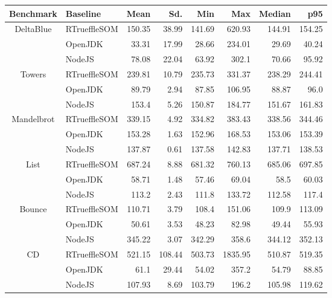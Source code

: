 \begin{center}
\begin{tabular}{ c | l r r r r r r}
\toprule
\textbf{Benchmark} & \textbf{Baseline} & \textbf{Mean} & \textbf{Sd.} & \textbf{Min} & \textbf{Max} & \textbf{Median} & \textbf{p95}\\
\toprule

\multirow{3}{*}{ DeltaBlue } & RTrueffleSOM & 150.35 & 38.99 & 141.69 & 620.93 & 144.91 & 154.25 \\
& OpenJDK & 33.31 & 17.99 & 28.66 & 234.01 & 29.69 & 40.24 \\
& NodeJS & 78.08 & 22.04 & 63.92 & 302.1 & 70.66 & 95.92 \\
\midrule

\multirow{3}{*}{ Towers } & RTrueffleSOM & 239.81 & 10.79 & 235.73 & 331.37 & 238.29 & 244.41 \\
& OpenJDK & 89.79 & 2.94 & 87.85 & 106.95 & 88.87 & 96.0 \\
& NodeJS & 153.4 & 5.26 & 150.87 & 184.77 & 151.67 & 161.83 \\
\midrule

\multirow{3}{*}{ Mandelbrot } & RTrueffleSOM & 339.15 & 4.92 & 334.82 & 383.43 & 338.56 & 344.46 \\
& OpenJDK & 153.28 & 1.63 & 152.96 & 168.53 & 153.06 & 153.39 \\
& NodeJS & 137.87 & 0.61 & 137.58 & 142.83 & 137.71 & 138.53 \\
\midrule

\multirow{3}{*}{ List } & RTrueffleSOM & 687.24 & 8.88 & 681.32 & 760.13 & 685.06 & 697.85 \\
& OpenJDK & 58.71 & 1.48 & 57.46 & 69.04 & 58.5 & 60.03 \\
& NodeJS & 113.2 & 2.43 & 111.8 & 133.72 & 112.58 & 117.4 \\
\midrule

\multirow{3}{*}{ Bounce } & RTrueffleSOM & 110.71 & 3.79 & 108.4 & 151.06 & 109.9 & 113.09 \\
& OpenJDK & 50.61 & 3.53 & 48.23 & 82.98 & 49.44 & 55.93 \\
& NodeJS & 345.22 & 3.07 & 342.29 & 358.6 & 344.12 & 352.13 \\
\midrule

\multirow{3}{*}{ CD } & RTrueffleSOM & 521.15 & 108.44 & 503.73 & 1835.95 & 510.87 & 519.35 \\
& OpenJDK & 61.1 & 29.44 & 54.02 & 357.2 & 54.79 & 88.85 \\
& NodeJS & 107.93 & 8.69 & 103.79 & 196.2 & 105.98 & 119.62 \\
\midrule


\end{tabular}
\end{center}
